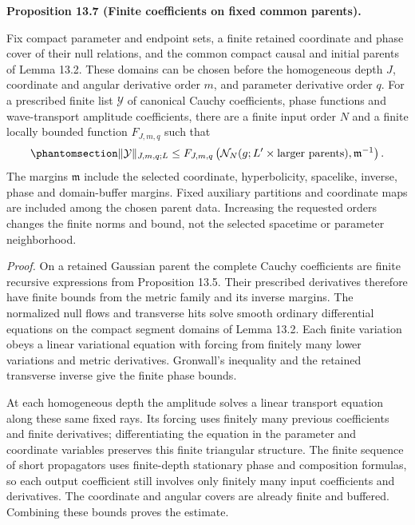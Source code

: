 \documentclass[
  english,
  11pt,
  reqno]{amsart}
\makeatletter
\newcommand{\pandocstatementheading}[1]{%
  \par\if@nobreak\else
    \addpenalty{\@beginparpenalty}%
    \addvspace{.5\baselineskip plus .2\baselineskip minus .2\baselineskip}%
  \fi
  {\normalfont\bfseries #1\par}%
  \nobreak\@afterindenttrue\@afterheading
}
\newcommand{\paperblockheading}[2][.45\baselineskip]{%
  \par\Needspace{6\baselineskip}%
  \addvspace{\baselineskip}%
  \noindent{\normalfont\bfseries #2}\par\nobreak
  \vskip#1\relax\nobreak
}
\makeatother
\begin{document}
\paperblockheading[0pt]{Estimates at finite orders.}

\pandocstatementheading{\protect{}\label{prop:family-wave-finite-estimates}Proposition 13.7 (Finite coefficients on fixed common parents).}

Fix compact parameter and endpoint sets, a finite retained coordinate
and phase cover of their null relations, and the common compact causal
and initial parents of Lemma 13.2. These domains can be chosen before
the homogeneous depth \(J\), coordinate and angular derivative order
\(m\), and parameter derivative order \(q\). For a prescribed finite
list \(\mathcal Y\) of canonical Cauchy coefficients, phase functions
and wave-transport amplitude coefficients, there are a finite input
order \(N\) and a finite locally bounded function \(F_{J,m,q}\) such
that
\begin{equation}\protect\phantomsection\label{eq:family-global-wave-finite-estimates}{
\|\mathcal Y\|_{J,m,q;L}
\le F_{J,m,q}\left(
\mathcal N_N(g;L'\times\text{larger parents}),
\mathfrak m^{-1}\right).
}\end{equation} The margins \(\mathfrak m\) include the selected
coordinate, hyperbolicity, spacelike, inverse, phase and domain-buffer
margins. Fixed auxiliary partitions and coordinate maps are included
among the chosen parent data. Increasing the requested orders changes
the finite norms and bound, not the selected spacetime or parameter
neighborhood.

\emph{Proof.} On a retained Gaussian parent the complete Cauchy
coefficients are finite recursive expressions from Proposition 13.5.
Their prescribed derivatives therefore have finite bounds from the
metric family and its inverse margins. The normalized null flows and
transverse hits solve smooth ordinary differential equations on the
compact segment domains of Lemma 13.2. Each finite variation obeys a
linear variational equation with forcing from finitely many lower
variations and metric derivatives. Gronwall's inequality and the
retained transverse inverse give the finite phase bounds.

At each homogeneous depth the amplitude solves a linear transport
equation along these same fixed rays. Its forcing uses finitely many
previous coefficients and finite derivatives; differentiating the
equation in the parameter and coordinate variables preserves this finite
triangular structure. The finite sequence of short propagators uses
finite-depth stationary phase and composition formulas, so each output
coefficient still involves only finitely many input coefficients and
derivatives. The coordinate and angular covers are already finite and
buffered. Combining these bounds proves the estimate.
\end{document}
